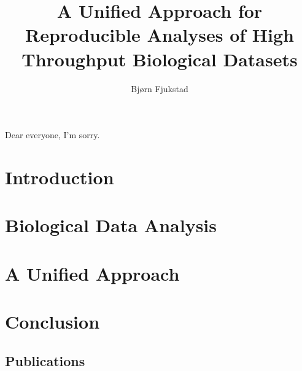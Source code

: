 \documentclass[USenglish,phd]{uit-thesis}
\begin{document}
 

\title{A Unified Approach for Reproducible Analyses of High Throughput
Biological Datasets}
\author{Bjørn Fjukstad}
\maketitle

\begin{dedication}
    Dear everyone, I'm sorry.
\end{dedication}

\frontmatter
 
 

\tableofcontents
\mainmatter

\chapter{Introduction}
 

\chapter{Biological Data Analysis}


\chapter{A Unified Approach}  


\chapter{Conclusion}
 

\appendix
\begin{appendix}
    \chapter{Publications}
\end{appendix}

\backmatter



\end{document}

